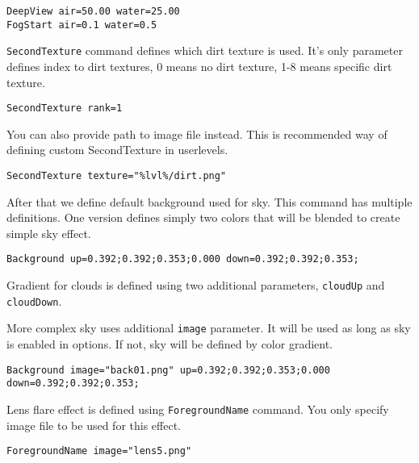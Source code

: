 \begin{lstlisting}[style=scene]
DeepView air=50.00 water=25.00
FogStart air=0.1 water=0.5
\end{lstlisting}

\texttt{SecondTexture} command defines which dirt texture is used. It's only parameter defines index to dirt textures, 0 means no dirt texture, 1-8 means specific dirt texture.

\begin{lstlisting}[style=scene]
SecondTexture rank=1
\end{lstlisting}

You can also provide path to image file instead. This is recommended way of defining custom SecondTexture in userlevels.
\begin{lstlisting}[style=scene]
SecondTexture texture="%lvl%/dirt.png"
\end{lstlisting}


After that we define default background used for sky. This command has multiple definitions. One version defines simply two colors that will be blended to create simple sky effect.

\begin{lstlisting}[style=scene]
Background up=0.392;0.392;0.353;0.000 down=0.392;0.392;0.353;
\end{lstlisting}

Gradient for clouds is defined using two additional parameters, \texttt{cloudUp} and \texttt{cloudDown}.


More complex sky uses additional \texttt{image} parameter. It will be used as long as sky is enabled in options. If not, sky will be defined by color gradient.

\begin{lstlisting}[style=scene]
Background image="back01.png" up=0.392;0.392;0.353;0.000 down=0.392;0.392;0.353;
\end{lstlisting}

Lens flare effect is defined using \texttt{ForegroundName} command. You only specify image file to be used for this effect.

\begin{lstlisting}[style=scene]
ForegroundName image="lens5.png"
\end{lstlisting}


